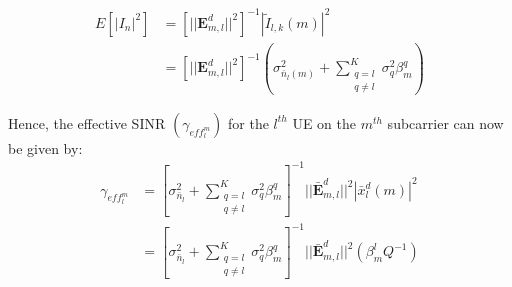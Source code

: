 \documentclass[conference]{IEEEtran}
\begin{document}
\begin{equation}
\label{twenty_five}
 \begin{split}
 E[|I_n|^2] &= [||\mathbf{E}_{m,l}^d||^2]^{-1} |\tilde{I}_{l,k}(m)|^2 \\ 
   & = [||\mathbf{E}_{m,l}^d||^2]^{-1} (\sigma^2_{\bar{n}_{l}(m)} + \sum_{\substack{ q=l \\ q \neq l}}^{K} \sigma_q^2 \beta^q_m) 
   \end{split}
\end{equation}

Hence, the effective SINR $(\gamma_{eff^m_l})$ for the $l^{th}$ UE on the $m^{th}$ subcarrier can now be given by:
\begin{equation}
       \label{twenty_six}
       \begin{split}
      \gamma_{eff^m_l} &= [\sigma_{\bar{n}_l}^2 + \sum_{\substack{ q=l \\ q \neq l}}^{K} \sigma_q^2 \beta^q_m ]^{-1}||\mathbf{\bar{E}}^d_{m,l}||^2 |\bar{x}_l^d (m)|^2 \\
            &= [\sigma_{\bar{n}_l}^2 + \sum_{\substack{ q=l \\ q \neq l}}^{K} \sigma_q^2 \beta^q_m ]^{-1}||\mathbf{\bar{E}}^d_{m,l}||^2 (\beta^l_m Q^{-1})
      \end{split}
       \end{equation}






\end{document}
